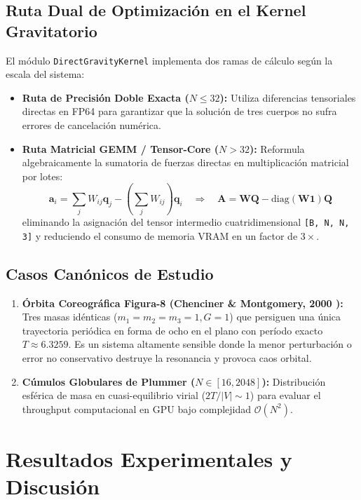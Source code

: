 \documentclass[11pt,a4paper]{article}
\begin{document}
\subsection{Ruta Dual de Optimización en el Kernel Gravitatorio}
El módulo \texttt{DirectGravityKernel} implementa dos ramas de cálculo según la escala del sistema:
\begin{itemize}
    \item \textbf{Ruta de Precisión Doble Exacta ($N \le 32$):} Utiliza diferencias tensoriales directas en FP64 para garantizar que la solución de tres cuerpos no sufra errores de cancelación numérica.
    \item \textbf{Ruta Matricial GEMM / Tensor-Core ($N > 32$):} Reformula algebraicamente la sumatoria de fuerzas directas en multiplicación matricial por lotes:
    \begin{equation}
        \mathbf{a}_i = \sum_{j} W_{ij} \mathbf{q}_j - \left(\sum_j W_{ij}\right) \mathbf{q}_i \quad \Longrightarrow \quad \mathbf{A} = \mathbf{W}\mathbf{Q} - \text{diag}(\mathbf{W}\mathbf{1})\mathbf{Q}
    \end{equation}
    eliminando la asignación del tensor intermedio cuatridimensional \texttt{[B, N, N, 3]} y reduciendo el consumo de memoria VRAM en un factor de $3\times$.
\end{itemize}

\subsection{Casos Canónicos de Estudio}
\begin{enumerate}
    \item \textbf{Órbita Coreográfica Figura-8 (Chenciner \& Montgomery, 2000 \cite{chenciner2000}):} Tres masas idénticas ($m_1=m_2=m_3=1, G=1$) que persiguen una única trayectoria periódica en forma de ocho en el plano con período exacto $T \approx 6.3259$. Es un sistema altamente sensible donde la menor perturbación o error no conservativo destruye la resonancia y provoca caos orbital.
    \item \textbf{Cúmulos Globulares de Plummer ($N \in [16, 2048]$):} Distribución esférica de masa en cuasi-equilibrio virial ($2T/|V| \sim 1$) para evaluar el throughput computacional en GPU bajo complejidad $\mathcal{O}(N^2)$.
\end{enumerate}

\section{Resultados Experimentales y Discusión}
\end{document}
